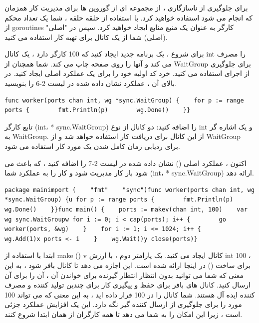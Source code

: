 \documentclass[12pt]{book}
\begin{document}
\subsubsection{}
برای جلوگیری از ناسازگاری ، از مجموعه ای از گوروین ها برای مدیریت کار همزمان که انجام می شود استفاده خواهید کرد. با استفاده از حلقه حلقه ، شما یک تعداد محکم از goroutines کارگر به عنوان یک منبع منابع ایجاد خواهید کرد. سپس در "اصلی" (اصلی) شما از یک کانال برای تهیه کار استفاده می کنید.

برای شروع ، یک برنامه جدید ایجاد کنید که 100 کارگر دارد ، یک کانال int را مصرف می کند و آنها را روی صفحه چاپ می کند. شما همچنان از WaitGroup برای جلوگیری از اجرای استفاده می کنید. خرد کد اولیه خود را برای یک عملکرد اصلی ایجاد کنید. در بالای آن ، عملکرد نشان داده شده در لیست 2-6 را بنویسید.
\begin{latin}
	\begin{lstlisting}[caption={  A worker function for processing work},captionpos=b]
	func worker(ports chan int, wg *sync.WaitGroup) {    for p := range ports {        fmt.Println(p)        wg.Done()    }}
	\end{lstlisting}
\end{latin}

تابع کارگر (int، * sync.WaitGroup) را اضافه کنید: دو کانال از نوع int و یک اشاره گر به WaitGroup. از این کانال برای دریافت کار استفاده خواهد شد و از WaitGroup برای ردیابی زمان کامل شدن یک مورد کار استفاده می شود.

اکنون ، عملکرد اصلی () نشان داده شده در لیست 2-7 را اضافه کنید ، که باعث می شود بار کار مدیریت شود و کار را به عملکرد شما (int، * sync.WaitGroup) ارائه دهد.
\begin{latin}
	\begin{lstlisting}[caption={   A basic worker pool (https://github.com/blackhat-go/ch-3/tcp-sync-scanner/main.go/)},captionpos=b]
	package mainimport (    "fmt"    "sync")func worker(ports chan int, wg *sync.WaitGroup) {u for p := range ports {        fmt.Println(p)        wg.Done()    }}func main() {    ports := makev(chan int, 100)    var wg sync.WaitGroupw for i := 0; i < cap(ports); i++ {        go worker(ports, &wg)    }    for i := 1; i <= 1024; i++ {        wg.Add(1)x ports <- i    }    wg.Wait()y close(ports)}
	\end{lstlisting}
\end{latin}

ابتدا با استفاده از make () v کانال ایجاد می کنید. یک پارامتر دوم ، با ارزش int 100 ، برای ساخت () در اینجا ارائه شده است. این اجازه می دهد تا کانال بافر شود ، به این معنی که شما می توانید بدون انتظار انتظار گیرنده برای خواندن آن ، آن را برای آن ارسال کنید. کانال های بافر برای حفظ و پیگیری کار برای چندین تولید کننده و مصرف کننده ایده آل هستند. شما کانال را در 100 قرار داده اید ، به این معنی که می تواند 100 مورد را برای جلوگیری از ارسال کننده گیر نگه دارد. این یک افزایش عملکرد جزئی است ، زیرا این امکان را به شما می دهد تا همه کارگران از همان ابتدا شروع کنند.
\end{document}
